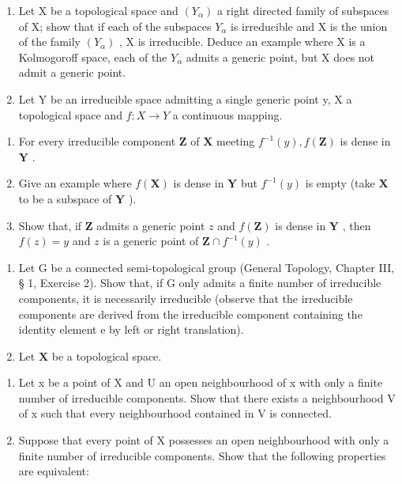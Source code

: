 \begin{enumerate}
\def\labelenumi{\arabic{enumi}.}
\setcounter{enumi}{2}
\item
  Let X be a topological space and \((Y_{\alpha})\) a right directed family of subspaces of X; show that if each of the subspaces \(Y_{\alpha}\) is irreducible and X is the union of the family \((Y_{\alpha})\) , X is irreducible. Deduce an example where X is a Kolmogoroff space, each of the \(Y_{\alpha}\) admits a generic point, but X does not admit a generic point.
\item
  Let Y be an irreducible space admitting a single generic point y, X a topological space and \(f: X \rightarrow Y\) a continuous mapping.
\end{enumerate}

\begin{enumerate}
\def\labelenumi{(\alph{enumi})}
\item
  For every irreducible component \(\mathbf{Z}\) of \(\mathbf{X}\) meeting \(f^{-1}(y), f(\mathbf{Z})\) is dense in \(\mathbf{Y}\) .
\item
  Give an example where \(f(\mathbf{X})\) is dense in \(\mathbf{Y}\) but \(f^{-1}(y)\) is empty (take \(\mathbf{X}\) to be a subspace of \(\mathbf{Y}\) ).
\item
  Show that, if \(\mathbf{Z}\) admits a generic point \(z\) and \(f(\mathbf{Z})\) is dense in \(\mathbf{Y}\) , then \(f(z) = y\) and \(z\) is a generic point of \(\mathbf{Z} \cap f^{-1}(y)\) .
\end{enumerate}

\begin{enumerate}
\def\labelenumi{\arabic{enumi}.}
\setcounter{enumi}{4}
\item
  Let G be a connected semi-topological group (General Topology, Chapter III, § 1, Exercise 2). Show that, if G only admits a finite number of irreducible components, it is necessarily irreducible (observe that the irreducible components are derived from the irreducible component containing the identity element e by left or right translation).
\item
  Let \(\mathbf{X}\) be a topological space.
\end{enumerate}

\begin{enumerate}
\def\labelenumi{(\alph{enumi})}
\item
  Let x be a point of X and U an open neighbourhood of x with only a finite number of irreducible components. Show that there exists a neighbourhood V of x such that every neighbourhood contained in V is connected.
\item
  Suppose that every point of X possesses an open neighbourhood with only a finite number of irreducible components. Show that the following properties are equivalent:
\end{enumerate}


